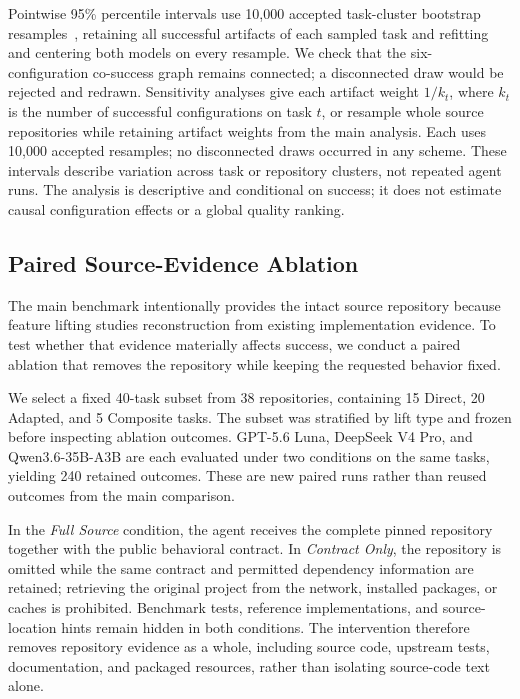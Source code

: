 \documentclass[acmsmall,screen,review,anonymous]{acmart}
\begin{document}
Pointwise 95\% percentile intervals use 10{,}000 accepted task-cluster bootstrap
resamples~\cite{field2007cluster}, retaining all successful artifacts of each sampled task and refitting
and centering both models on every resample. We check that the six-configuration
co-success graph remains connected; a disconnected draw would be rejected and
redrawn. Sensitivity analyses give each artifact weight $1/k_t$, where $k_t$ is
the number of successful configurations on task $t$, or resample whole source
repositories while retaining artifact weights from the main analysis. Each uses
10{,}000 accepted resamples; no disconnected draws occurred in any scheme.
These intervals describe variation across task or repository clusters, not
repeated agent runs. The analysis is descriptive and conditional on success;
it does not estimate causal configuration effects or a global quality ranking.

\subsection{Paired Source-Evidence Ablation}
\label{sec:source-ablation-protocol}

The main benchmark intentionally provides the intact source repository because
feature lifting studies reconstruction from existing implementation evidence. To
test whether that evidence materially affects success, we conduct a paired
ablation that removes the repository while keeping the requested behavior fixed.

We select a fixed 40-task subset from 38 repositories, containing 15 Direct,
20 Adapted, and 5 Composite tasks. The subset was stratified by lift type and
frozen before inspecting ablation outcomes. GPT-5.6 Luna,
DeepSeek V4 Pro, and Qwen3.6-35B-A3B are each evaluated under two conditions
on the same tasks, yielding 240 retained outcomes. These are new paired runs
rather than reused outcomes from the main comparison.

In the \emph{Full Source} condition, the agent receives the complete pinned
repository together with the public behavioral contract. In \emph{Contract
Only}, the repository is omitted while the same contract and permitted
dependency information are retained; retrieving the original project from the
network, installed packages, or caches is prohibited. Benchmark tests, reference
implementations, and source-location hints remain hidden in both conditions. The
intervention therefore removes repository evidence as a whole, including source
code, upstream tests, documentation, and packaged resources, rather than
isolating source-code text alone.
\end{document}

